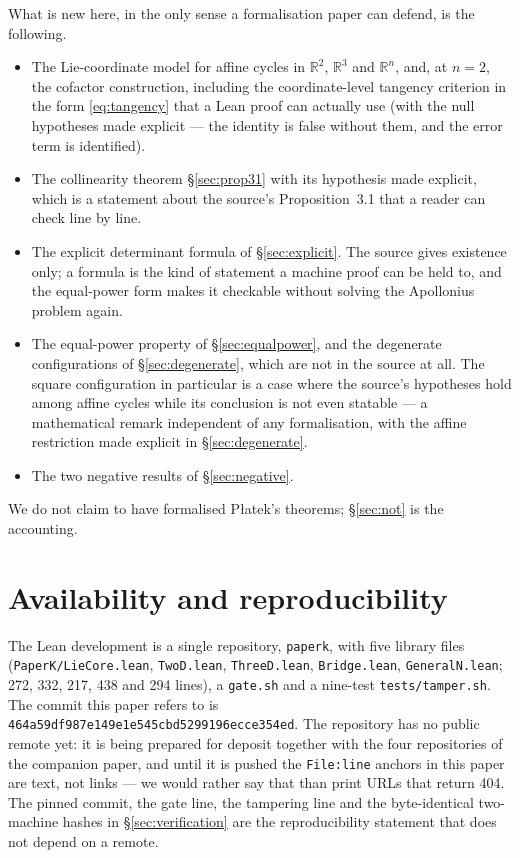 \documentclass[11pt]{article}
\theoremstyle{definition}
\theoremstyle{remark}
\newcommand{\pkcommit}{464a59df987e149e1e545cbd5299196ecce354ed}
\newcommand{\RR}{\mathbb{R}}
\begin{document}
What is new here, in the only sense a formalisation paper can defend, is the following.
\begin{itemize}
\item The Lie-coordinate model for affine cycles in $\RR^2$, $\RR^3$ and $\RR^n$, and, at $n=2$,
the cofactor construction, including the coordinate-level tangency criterion in the form \eqref{eq:tangency} that
a Lean proof can actually use (with the null hypotheses made explicit --- the identity is false
without them, and the error term is identified).
\item The collinearity theorem \S\ref{sec:prop31} with its hypothesis made explicit, which is a
statement about the source's Proposition~3.1 that a reader can check line by line.
\item The explicit determinant formula of \S\ref{sec:explicit}. The source gives existence only; a
formula is the kind of statement a machine proof can be held to, and the equal-power form makes it
checkable without solving the Apollonius problem again.
\item The equal-power property of \S\ref{sec:equalpower}, and the degenerate configurations of
\S\ref{sec:degenerate}, which are not in the source at all. The square configuration in particular is
a case where the source's hypotheses hold among affine cycles while its conclusion is not even
statable --- a mathematical remark independent of any formalisation, with the affine restriction made
explicit in \S\ref{sec:degenerate}.
\item The two negative results of \S\ref{sec:negative}.
\end{itemize}
We do not claim to have formalised Płatek's theorems; \S\ref{sec:not} is the accounting.

\section{Availability and reproducibility}\label{sec:availability}

The Lean development is a single repository, \texttt{paperk}, with five library files
(\texttt{PaperK/LieCore.lean}, \texttt{TwoD.lean}, \texttt{ThreeD.lean}, \texttt{Bridge.lean},
\texttt{GeneralN.lean}; 272, 332, 217, 438 and 294 lines), a \texttt{gate.sh} and a nine-test \texttt{tests/tamper.sh}. The commit
this paper refers to is \texttt{\pkcommit}. The repository has no public remote yet: it is being
prepared for deposit together with the four repositories of the companion paper, and until it is
pushed the \texttt{File:line} anchors in this paper are text, not links --- we would rather say that
than print URLs that return 404. The pinned commit, the gate line, the tampering line and the
byte-identical two-machine hashes in \S\ref{sec:verification} are the reproducibility statement that
does not depend on a remote.
\end{document}
